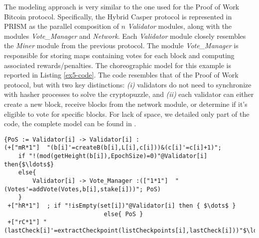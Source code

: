 The modeling approach is very similar to the one used for the Proof of Work Bitcoin protocol. Specifically, the Hybrid Casper protocol is represented in PRISM as the parallel composition of $n$ \emph{Validator} modules, along with the modules \emph{Vote\_Manager} and \emph{Network}. Each \emph{Validator} module closely resembles the \emph{Miner} module from the previous protocol. The module \emph{Vote\_Manager} is responsible for storing maps containing votes for each block and computing associated rewards/penalties.
The choreographic model for this example is reported in Listing \ref{ex5-code}. 
The code resembles that of the Proof of Work protocol, but with two key distinctions: \emph{(i)} validators do not need to synchronize with hasher processes to solve the cryptopuzzle, and \emph{(ii)} each validator can either create a new block, receive blocks from the network module, or determine if it's eligible to vote for specific blocks.
For lack of space, we detailed only part of the code, the complete model can be found in \cite{repository}.
\begin{lstlisting}[style=chor-color,tabsize=2,breaklines=true, postbreak=\mbox{\textcolor{red}{$\hookrightarrow$}\space},	caption={Excerpt of the Hybrid Casper Protocol as a choreography},captionpos=b,label={ex5-code}]
{PoS := Validator[i] -> Validator[i] :
(+["mR*1"]  "(b[i]'=createB(b[i],L[i],c[i]))&(c[i]'=c[i]+1)"; 
	if "!(mod(getHeight(b[i]),EpochSize)=0)"@Validator[i] then{$\ldots$}
	else{
		Validator[i] -> Vote_Manager :(["1*1"]  "(Votes'=addVote(Votes,b[i],stake[i]))"; PoS)
	}
 +["hR*1"]  ; if "!isEmpty(set[i])"@Validator[i] then { $\dots$ }
 							else{ PoS }
 +["rC*1"] "(lastCheck[i]'=extractCheckpoint(listCheckpoints[i],lastCheck[i]))"$\ldots$}

\end{lstlisting}
